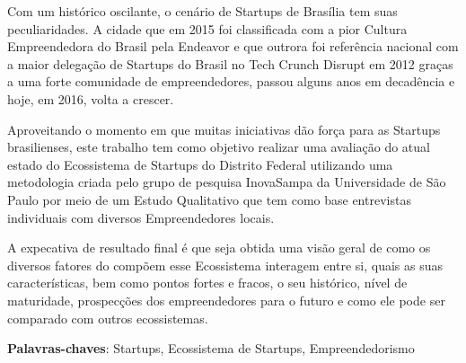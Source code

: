 \begin{resumo}

Com um histórico oscilante, o cenário de Startups de Brasília tem suas peculiaridades. A cidade que em 2015 foi classificada com a pior Cultura Empreendedora do Brasil pela Endeavor e que outrora foi referência nacional com a maior delegação de Startups do Brasil no Tech Crunch Disrupt em 2012 graças a uma forte comunidade de empreendedores, passou alguns anos em decadência e hoje, em 2016, volta a crescer.

Aproveitando o momento em que muitas iniciativas dão força para as Startups brasilienses, este trabalho tem como objetivo realizar uma avaliação do atual estado do Ecossistema de Startups do Distrito Federal utilizando uma metodologia criada pelo grupo de pesquisa InovaSampa da Universidade de São Paulo por meio de um Estudo Qualitativo que tem como base entrevistas individuais com diversos Empreendedores locais.

A expecativa de resultado final é que seja obtida uma visão geral de como os diversos fatores do compõem esse Ecossistema interagem entre si, quais as suas características, bem como pontos fortes e fracos, o seu histórico, nível de maturidade, prospecções dos empreendedores para o futuro e como ele pode ser comparado com outros ecossistemas.

 \vspace{\onelineskip}

 \noindent
 \textbf{Palavras-chaves}: Startups, Ecossistema de Startups, Empreendedorismo
\end{resumo}
